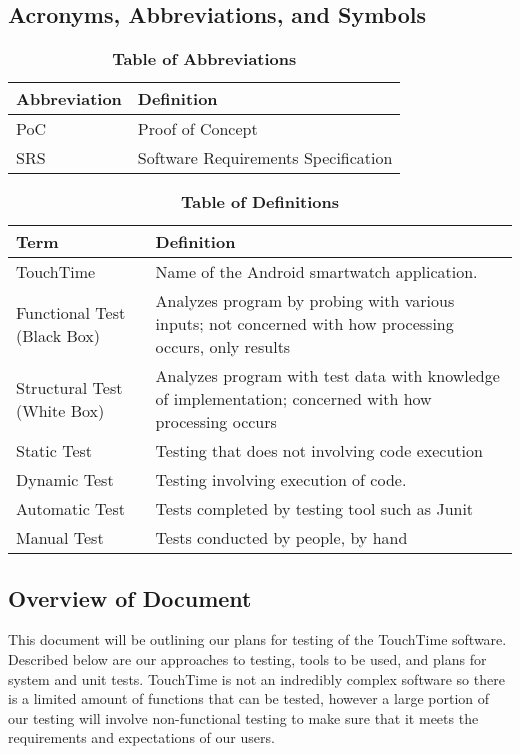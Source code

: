 \subsection{Acronyms, Abbreviations, and Symbols}
	
\begin{table}[H]
\caption{\textbf{Table of Abbreviations}} \label{Table}

\begin{tabularx}{\textwidth}{p{3cm}X}
\toprule
\textbf{Abbreviation} & \textbf{Definition} \\
\midrule
PoC & Proof of Concept\\
SRS & Software Requirements Specification\\
\bottomrule
\end{tabularx}

\end{table}

\begin{table}[H]
\caption{\textbf{Table of Definitions}} \label{Table}

\begin{tabularx}{\textwidth}{p{3cm}X}
\toprule
\textbf{Term} & \textbf{Definition}\\
\midrule
TouchTime & Name of the Android smartwatch application. \\
Functional Test (Black Box) & Analyzes program by probing with various inputs; not concerned with how processing occurs, only results \\
Structural Test (White Box) & Analyzes program with test data with knowledge of implementation; concerned with how processing occurs \\
Static Test & Testing that does not involving code execution\\
Dynamic Test & Testing involving execution of code.\\
Automatic Test & Tests completed by testing tool such as Junit\\
Manual Test & Tests conducted by people, by hand \\
\bottomrule
\end{tabularx}

\end{table}	

\subsection{Overview of Document}
This document will be outlining our plans for testing of the TouchTime software. Described below are our approaches to testing, tools to be used, and plans for system and unit tests. TouchTime is not an indredibly complex software so there is a limited amount of functions that can be tested, however a large portion of our testing will involve non-functional testing to make sure that it meets the requirements and expectations of our users.

